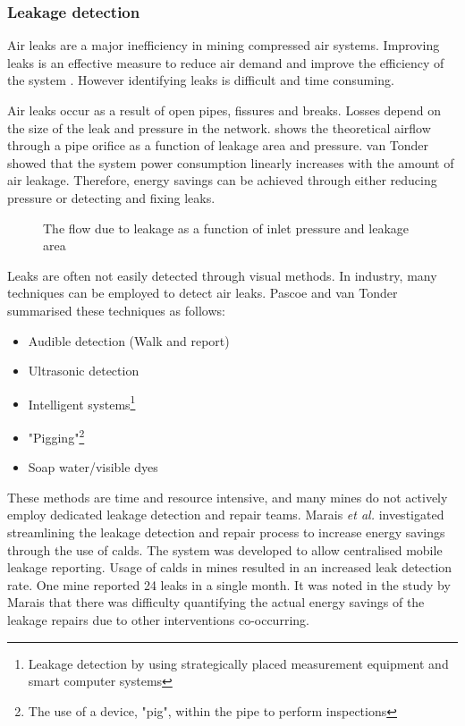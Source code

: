 		 \subsubsection{Leakage detection}	 
		 Air leaks are a major inefficiency in mining compressed air systems. Improving leaks is an effective measure to reduce air demand and improve the efficiency of the system \cite{van2011sustaining}. However identifying leaks is difficult and time consuming.
		 \par 
		  Air leaks occur as a result of open pipes, fissures and breaks. Losses depend on the size of the leak and pressure in the network.  shows the theoretical airflow through a pipe orifice as a function of leakage area and pressure\footnotemark[1]. van Tonder \cite{van2011sustaining} showed that the system power consumption linearly increases with the amount of air leakage. Therefore, energy savings can be achieved through either reducing pressure or detecting and fixing leaks.
		 \begin{figure}[h]
		 	\centering
		 	\fbox{\hspace{2cm}\hspace{2cm}}
		 	\caption[The flow due to leakage as a function of inlet pressure and leakage area]{ The flow due to leakage as a function of inlet pressure and leakage area\protect\footnotemark[1]}
		 	\label{fig: Leak losses}
		 \end{figure}
	 \par 
		 Leaks are often not easily detected through visual methods. In industry, many techniques can be employed to detect air leaks. Pascoe \cite{Pascoe2016Masters} and van Tonder \cite{vanTonder2010Masters} summarised these techniques as follows:
		 \begin{itemize}
		 	\item Audible detection (Walk and report)
		 	\item Ultrasonic detection
		 	\item Intelligent systems\footnote{Leakage detection by using strategically placed measurement equipment and smart computer systems}
		 	\item "Pigging"\footnote{The use of a device, "pig", within the pipe to perform inspections}
		 	\item Soap water/visible dyes 
		 \end{itemize}
	 	 These methods are time and resource intensive, and many mines do not actively employ dedicated leakage detection and repair teams. Marais \textit{et al.} \cite{marais2009increased} investigated streamlining the leakage detection and repair process to increase energy savings through the use of \gls{calds}. The system was developed to allow centralised mobile leakage reporting. Usage of \gls{calds} in mines resulted in an increased leak detection rate. One mine reported 24 leaks in a single month. It was noted in the study by Marais that there was difficulty quantifying the actual energy savings of the leakage repairs due to other interventions co-occurring.	
		 
